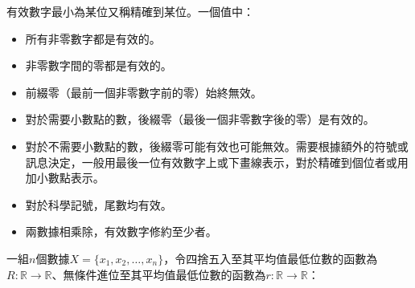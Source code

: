 \documentclass[a4paper,12pt]{article}
\begin{document}
有效數字最小為某位又稱精確到某位。一個值中：
\begin{itemize}
\item 所有非零數字都是有效的。
\item 非零數字間的零都是有效的。
\item 前綴零（最前一個非零數字前的零）始終無效。
\item 對於需要小數點的數，後綴零（最後一個非零數字後的零）是有效的。
\item 對於不需要小數點的數，後綴零可能有效也可能無效。需要根據額外的符號或訊息決定，一般用最後一位有效數字上或下畫線表示，對於精確到個位者或用加小數點表示。
\item 對於科學記號，尾數均有效。
\item 兩數據相乘除，有效數字修約至少者。
\end{itemize}
一組$n$個數據$X=\{x_1,x_2,\ldots,x_n\}$，令四捨五入至其平均值最低位數的函數為$R\colon\mathbb{R}\to\mathbb{R}$、無條件進位至其平均值最低位數的函數為$r\colon\mathbb{R}\to\mathbb{R}$：
\end{document}
